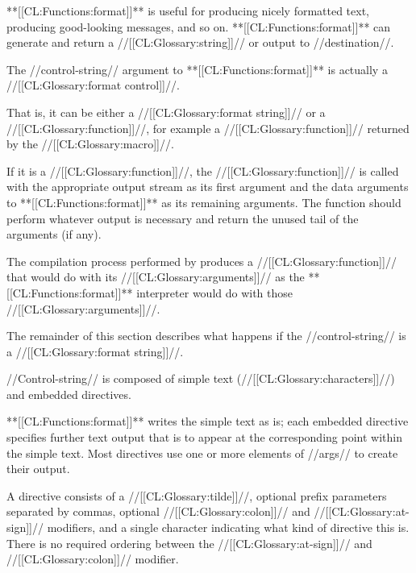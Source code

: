 




**[[CL:Functions:format]]** is useful for producing nicely formatted text, producing
good-looking messages, and so on.  **[[CL:Functions:format]]** can generate and return
a //[[CL:Glossary:string]]// or output to //destination//.

The //control-string// argument to **[[CL:Functions:format]]** is actually a //[[CL:Glossary:format control]]//.



That is, it can be either a //[[CL:Glossary:format string]]// or a //[[CL:Glossary:function]]//,
for example a //[[CL:Glossary:function]]// returned
by the  //[[CL:Glossary:macro]]//.

If it is a //[[CL:Glossary:function]]//, the //[[CL:Glossary:function]]// is called with the appropriate
output stream as its first argument and the data arguments to **[[CL:Functions:format]]**
as its remaining arguments.  The function should perform whatever output is 
necessary and return the unused tail of the arguments (if any).

The compilation process performed by  produces a //[[CL:Glossary:function]]//
that would do with its //[[CL:Glossary:arguments]]// as the **[[CL:Functions:format]]** interpreter
would do with those //[[CL:Glossary:arguments]]//.

The remainder of this section describes what happens if the //control-string//
is a //[[CL:Glossary:format string]]//.  











//Control-string// is composed of simple text (//[[CL:Glossary:characters]]//) 
and embedded directives.


**[[CL:Functions:format]]** writes the simple text as is;
each embedded directive specifies further text output 
that is to appear at the corresponding point within the simple text.  
Most directives use one or more elements of //args// to
create their output.


A directive consists of a //[[CL:Glossary:tilde]]//,
optional prefix parameters
separated by commas, optional //[[CL:Glossary:colon]]// and //[[CL:Glossary:at-sign]]// modifiers,
and a single character indicating what kind of directive this is.
There is no required ordering between the //[[CL:Glossary:at-sign]]// and //[[CL:Glossary:colon]]// modifier.

